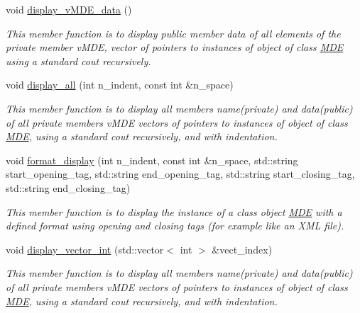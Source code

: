 \begin{DoxyCompactItemize}
void \hyperlink{group__group__display_ga5ce5603ab12845a6f1bdb2f909b5ef16}{display\+\_\+v\+M\+D\+E\+\_\+data} ()
\begin{DoxyCompactList}\small\item\em This member function is to display public member \textquotesingle{}data\textquotesingle{} of all elements of the private member v\+M\+DE, vector of pointers to instances of object of class \hyperlink{classMDE}{M\+DE} using a standard cout recursively. \end{DoxyCompactList}\item 
void \hyperlink{group__group__display_ga209fa87837f6b30256bbcdf8f33e1752}{display\+\_\+all} (int n\+\_\+indent, const int \&n\+\_\+space)
\begin{DoxyCompactList}\small\item\em This member function is to display all members \textquotesingle{}name\textquotesingle{}(private) and \textquotesingle{}data\textquotesingle{}(public) of all private members v\+M\+DE vectors of pointers to instances of object of class \hyperlink{classMDE}{M\+DE}, using a standard cout recursively, and with indentation. \end{DoxyCompactList}\item 
void \hyperlink{group__group__display_gaa484ce5bc4e4726e45e06789b0891b6f}{format\+\_\+display} (int n\+\_\+indent, const int \&n\+\_\+space, std\+::string start\+\_\+opening\+\_\+tag, std\+::string end\+\_\+opening\+\_\+tag, std\+::string start\+\_\+closing\+\_\+tag, std\+::string end\+\_\+closing\+\_\+tag)
\begin{DoxyCompactList}\small\item\em This member function is to display the instance of a class object \hyperlink{classMDE}{M\+DE} with a defined format using opening and closing tags (for example like an X\+ML file). \end{DoxyCompactList}\item 
void \hyperlink{group__group__display_gaeee364777c1584d310bd698c9e9b40f4}{display\+\_\+vector\+\_\+int} (std\+::vector$<$ int $>$ \&vect\+\_\+index)
\begin{DoxyCompactList}\small\item\em This member function is to display all members \textquotesingle{}name\textquotesingle{}(private) and \textquotesingle{}data\textquotesingle{}(public) of all private members v\+M\+DE vectors of pointers to instances of object of class \hyperlink{classMDE}{M\+DE}, using a standard cout recursively, and with indentation. \end{DoxyCompactList}\item 

\end{DoxyCompactItemize}
